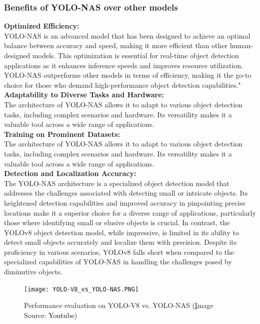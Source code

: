 \subsubsection{Benefits of YOLO-NAS over other models}
\textbf{Optimized Efficiency: }\\
YOLO-NAS is an advanced model that has been designed to achieve an optimal balance between accuracy and speed, making it more efficient than other human-designed models. This optimization is essential for real-time object detection applications as it enhances inference speeds and improves resource utilization. YOLO-NAS outperforms other models in terms of efficiency, making it the go-to choice for those who demand high-performance object detection capabilities." \\
\textbf{Adaptability to Diverse Tasks and Hardware: }\\
The architecture of YOLO-NAS allows it to adapt to various object detection tasks, including complex scenarios and hardware. Its versatility makes it a valuable tool across a wide range of applications.\\
\textbf{Training on Prominent Datasets: }\\
The architecture of YOLO-NAS allows it to adapt to various object detection tasks, including complex scenarios and hardware. Its versatility makes it a valuable tool across a wide range of applications.\\
\textbf{Detection and Localization Accuracy: }\\
The YOLO-NAS architecture is a specialized object detection model that addresses the challenges associated with detecting small or intricate objects. Its heightened detection capabilities and improved accuracy in pinpointing precise locations make it a superior choice for a diverse range of applications, particularly those where identifying small or elusive objects is crucial. In contrast, the YOLOv8 object detection model, while impressive, is limited in its ability to detect small objects accurately and localize them with precision. Despite its proficiency in various scenarios, YOLOv8 falls short when compared to the specialized capabilities of YOLO-NAS in handling the challenges posed by diminutive objects. \cite{yolo-nas-vs-yolov8}
\begin{figure}[H]
    \centering
    \texttt{[image: YOLO-V8\_vs\_YOLO-NAS.PNG]}
    \caption{Performance evaluation on YOLO-V8 vs. YOLO-NAS (\href{https://www.youtube.com/watch?v=uPgE8G4CGF4} Image Source: {\textcolor{black}{Youtube}})}
    \label{Yolo-V8_vs_YOLO-NAS}
\end{figure}


